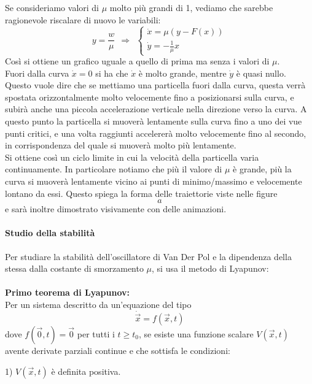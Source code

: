 \documentclass[12pt]{article}
\newcommand{\vo}{\vec{0}}
\begin{document}
Se consideriamo valori di $\mu$ molto più grandi di 1, vediamo che sarebbe ragionevole riscalare di nuovo le variabili:
\begin{equation}
	y = \frac{w}{\mu} \ \ \Longrightarrow \ \ \begin{cases}
		\dot{x} = \mu(y - F(x)) \\
		\dot{y} = -\frac{1}{\mu}x	
	\end{cases}
\end{equation}
Così si ottiene un grafico uguale a quello di prima ma senza i valori di $\mu$. \\
Fuori dalla curva $\dot{x} = 0$ si ha che $\dot{x}$ è molto grande, mentre $\dot{y}$ è quasi nullo. Questo vuole dire che se mettiamo una particella fuori dalla curva, questa verrà spostata orizzontalmente molto velocemente fino a posizionarsi sulla curva, e subirà anche una piccola accelerazione verticale nella direzione verso la curva. A questo punto la particella si muoverà lentamente sulla curva fino a uno dei vue punti critici, e una volta raggiunti accelererà molto velocemente fino al secondo, in corrispondenza del quale si muoverà molto più lentamente. \\
Si ottiene così un ciclo limite in cui la velocità della particella varia continuamente. In particolare notiamo che più il valore di $\mu$ è grande, più la curva si muoverà lentamente vicino ai punti di minimo/massimo e velocemente lontano da essi. Questo spiega la forma delle traiettorie viste nelle figure $$ a $$ e sarà inoltre dimostrato visivamente con delle animazioni.
\paragraph{Studio della stabilità \\}
Per studiare la stabilità dell'oscillatore di Van Der Pol e la dipendenza della stessa dalla costante di smorzamento $\mu$, si usa il metodo di Lyapunov: \\ \\
\textbf{Primo teorema di Lyapunov: \\}
Per un sistema descritto da un'equazione del tipo 
\begin{equation}
	\dot{\vec{x}} = f(\vec{x},t)
\end{equation}
dove $f(\vo,t) = \vo$ per tutti i $t \geq t_0$, se esiste una funzione scalare $V(\vec{x},t)$ avente derivate parziali continue e che sottisfa le condizioni: 

1) $V(\vec{x},t)$ è definita positiva. 
\end{document}
